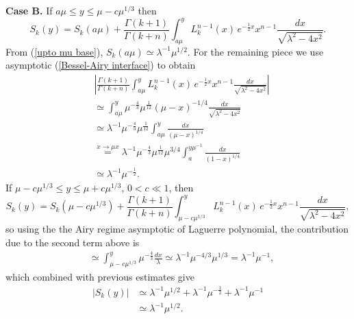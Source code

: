 \documentclass[11pt, reqno]{amsart}
\theoremstyle{plain}
\theoremstyle{remark}
\theoremstyle{example}
\theoremstyle{definition}
\numberwithin{equation}{section}
\begin{document}
\textbf{Case B.} If $a \mu \leq y \leq \mu - c \mu^{1/3}$ then
\begin{equation*}
    S_{k}(y) = S_{k}(a \mu) +    \frac{\Gamma(k+1)}{\Gamma(k+n)}  \int_{a \mu}^{y}  L_{k}^{n-1}(x) \, e^{-\frac{1}{2} x }  x^{n-1} \frac{dx}{\sqrt{\lambda^2 - 4 x^2}}.
\end{equation*}
From (\ref{upto mu base}), $S_{k}(a \mu) \simeq  \lambda^{-1} \mu^{1/2} $. For the remaining piece we use asymptotic (\ref{Bessel-Airy interface}) to obtain
\begin{equation}\label{B case before nbd of mu}
    \begin{split}
        & \left|   \frac{\Gamma(k+1)}{\Gamma(k+n)}  \int_{a \mu}^{y}  L_{k}^{n-1}(x) \, e^{-\frac{1}{2} x }  x^{n-1} \frac{dx}{\sqrt{\lambda^2 - 4 x^2}}    \right| \\
        & \simeq    \int_{a \mu}^{y}  \mu^{- \frac{4}{3}} \mu^{\frac{1}{12}} (\mu - x)^{- 1/4} \frac{dx}{\sqrt{\lambda^2 - 4 x^2}}\\
        & \simeq  \lambda^{-1} \mu^{- \frac{4}{3}} \mu^{\frac{1}{12}}  \int_{a \mu}^{y}    \frac{dx}{(\mu - x)^{1/4}}\\
         & \overset{ x \rightarrow \mu x}{=} \lambda^{-1} \mu^{- \frac{4}{3}} \mu^{\frac{1}{12}} \mu^{3/4}  \int_{a }^{y \mu^{-1}}    \frac{dx}{(1 - x)^{1/4}}\\
         & \simeq \lambda^{-1} \mu^{- \frac{1}{2}}.
    \end{split}
\end{equation}
If $\mu - c \mu^{1/3} \leq y \leq \mu + c \mu^{1/3}$, $0<c \ll 1$, then
\begin{equation*}
    S_{k}(y) = S_{k}(\mu - c \mu^{1/3}) +    \frac{\Gamma(k+1)}{\Gamma(k+n)}  \int_{\mu - c \mu^{1/3}}^{y}  L_{k}^{n-1}(x) \, e^{-\frac{1}{2} x }  x^{n-1} \frac{dx}{\sqrt{\lambda^2 - 4 x^2}},
\end{equation*}
so using the the Airy regime asymptotic of Laguerre polynomial, the contribution due to the  second term above is  
\begin{equation}
    \begin{split}
        & \simeq   \int_{\mu - c \mu^{1/3}}^{y}   \mu^{- \frac{4}{3}}  \frac{dx}{\lambda} \simeq \lambda^{-1} \mu^{-4/3} \mu^{1/3}= \lambda^{-1} \mu^{-1},
    \end{split}
\end{equation}
which combined with previous estimates give 
\begin{equation}\label{B case around nbd of mu}
    \begin{split}
        |S_{k}(y)| & \simeq  \lambda^{-1} \mu^{1/2} + \lambda^{-1} \mu^{- \frac{1}{2}} +  \lambda^{-1} \mu^{-1}\\
        & \simeq  \lambda^{-1} \mu^{1/2}.
    \end{split}
\end{equation}
\end{document}
